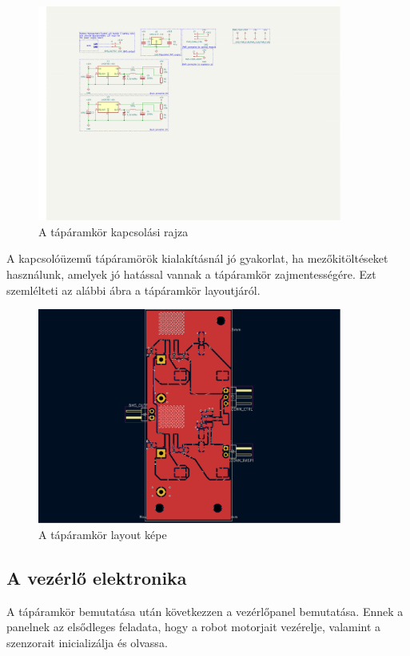 \begin{figure}
  \centering
  \includegraphics[width=100mm, keepaspectratio]{figures/ch1/power-supply-unit-schematic.png}
  \caption{A tápáramkör kapcsolási rajza}
  \label{fig:pwr_schematic}
\end{figure}

A kapcsolóüzemű tápáramörök kialakításnál jó gyakorlat, ha mezőkitöltéseket
használunk, amelyek jó hatással vannak a tápáramkör zajmentességére. Ezt
szemlélteti az alábbi ábra a tápáramkör layoutjáról.

\begin{figure}
  \centering
  \includegraphics[width=100mm, keepaspectratio]{figures/ch1/power-supply-unit-layout.png}
  \caption{A tápáramkör layout képe}
  \label{fig:pwr_layout}
\end{figure}

\subsection{A vezérlő elektronika}
A tápáramkör bemutatása után következzen a vezérlőpanel bemutatása. Ennek a
panelnek az elsődleges feladata, hogy a robot motorjait vezérelje, valamint
a szenzorait inicializálja és olvassa.

